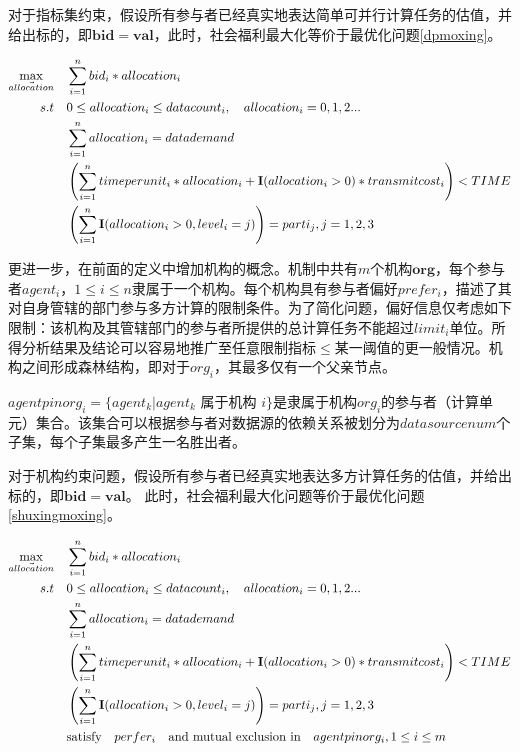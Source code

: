 \documentclass[promaster]{thesis-uestc}
\begin{document}


对于指标集约束，假设所有参与者已经真实地表达简单可并行计算任务的估值，并给出标的，即$\mathbf{bid} = \mathbf{val}$，此时，社会福利最大化等价于最优化问题\ref{dpmoxing}。

\begin{align}
    \label{dpmoxing}
    \max_{\vec{allocation}} \quad&\sum_{i=1}^{n}{bid_i*allocation_i}\\
    s.t\quad& 0\leq allocation_i\leq datacount_i,\quad allocation_i = {0,1,2...}\notag\\
        \quad& \sum_{i=1}^{n}{allocation_i} = datademand\notag\\
        \quad& \left(\sum_{i=1}^{n}{timeperunit_i*allocation_i+\mathbf{I}(allocation_i > 0)*transmitcost_i}\right) < TIME\notag\\
        \quad& \left(\sum_{i=1}^{n}{\mathbf{I}(allocation_i > 0,level_i = j)}\right)=parti_j, j = {1,2,3}\notag
\end{align}

更进一步，在前面的定义中增加机构的概念。机制中共有$m$个机构$\mathbf{org}$，每个参与者$agent_i$，$1 \leq i \leq n$隶属于一个机构。每个机构具有参与者偏好$prefer_i$，描述了其对自身管辖的部门参与多方计算的限制条件。为了简化问题，偏好信息仅考虑如下限制：该机构及其管辖部门的参与者所提供的总计算任务不能超过$limit_i$单位。所得分析结果及结论可以容易地推广至任意限制指标$\leq$某一阈值的更一般情况。机构之间形成森林结构，即对于$org_i$，其最多仅有一个父亲节点。

$agentpinorg_i=\{agent_k|agent_k\text{ 属于机构 }i\}$是隶属于机构$org_i$的参与者（计算单元）集合。该集合可以根据参与者对数据源的依赖关系被划分为$datasourcenum$个子集，每个子集最多产生一名胜出者。

对于机构约束问题，假设所有参与者已经真实地表达多方计算任务的估值，并给出标的，即$\mathbf{bid} = \mathbf{val}$。 此时，社会福利最大化问题等价于最优化问题\ref{shuxingmoxing}。

\begin{align}
    \label{shuxingmoxing}\max_{\vec{allocation}} \quad&\sum_{i=1}^{n}{bid_i*allocation_i}\\
    s.t\quad& 0\leq allocation_i\leq datacount_i,\quad allocation_i = {0,1,2...}\notag\\
        \quad& \sum_{i=1}^{n}{allocation_i} = datademand\notag\\
        \quad& \left(\sum_{i=1}^{n}{timeperunit_i*allocation_i+\mathbf{I}(allocation_i > 0)*transmitcost_i}\right) < TIME\notag\\
        \quad& \left(\sum_{i=1}^{n}{\mathbf{I}(allocation_i > 0,level_i = j)}\right)=parti_j, j = {1,2,3}\notag\\
        \quad& \text{satisfy}\quad perfer_i \quad \text{and mutual exclusion in}\quad agentpinorg_i, 1\leq i\leq m \notag
\end{align}
\end{document}
